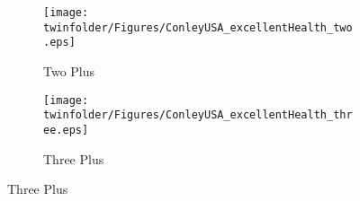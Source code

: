 \begin{figure}[htpb!]
\begin{center}
\caption{Plausibly Exogenous Bounds: Excellent Health (USA)}
\label{TWINfig:HPEx-USA}
\begin{subfigure}{.5\textwidth}
  \centering
  \texttt{[image: \\twinfolder/Figures/ConleyUSA\_excellentHealth\_two.eps]}
  \caption{Two Plus}
  \label{TWINfig:HPEx-USA2}
\end{subfigure}%
\begin{subfigure}{.5\textwidth}
  \centering
  \texttt{[image: \\twinfolder/Figures/ConleyUSA\_excellentHealth\_three.eps]}
  \caption{Three Plus}
  \label{TWINfig:HPEx-USA2}
\end{subfigure}
\end{center}
\end{figure}

